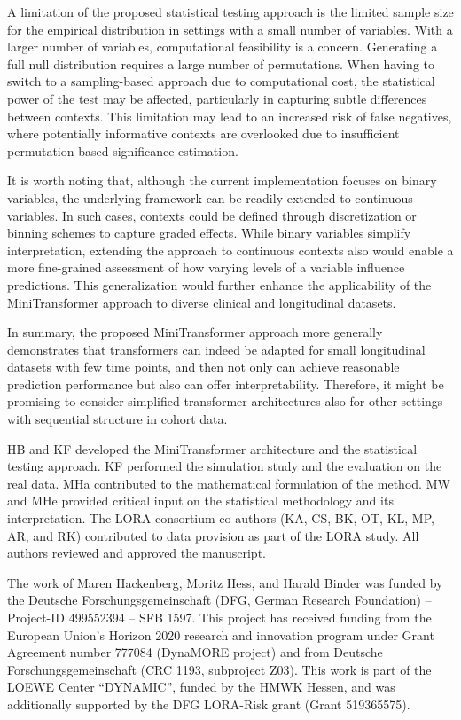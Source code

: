 \documentclass[AMA,Times1COL]{WileyNJDv5} %
\begin{document}
A limitation of the proposed statistical testing approach is the limited sample size for the empirical distribution in settings with a small number of variables. With a larger number of variables, computational feasibility is a concern. Generating a full null distribution requires a large number of permutations. When having to switch to a sampling-based approach due to computational cost,  the statistical power of the test may be affected, particularly in capturing subtle differences between contexts. This limitation may lead to an increased risk of false negatives, where potentially informative contexts are overlooked due to insufficient permutation-based significance estimation. 

It is worth noting that, although the current implementation focuses on binary variables, the underlying framework can be readily extended to continuous variables. In such cases, contexts could be defined through discretization or binning schemes to capture graded effects. While binary variables simplify interpretation, extending the approach to continuous contexts also would enable a more fine-grained assessment of how varying levels of a variable influence predictions. This generalization would further enhance the applicability of the MiniTransformer approach to diverse clinical and longitudinal datasets.

In summary, the proposed MiniTransformer approach more generally demonstrates that transformers can indeed be adapted for small longitudinal datasets with few time points, and then not only can achieve reasonable prediction performance but also can offer interpretability. Therefore, it might be promising to consider simplified transformer architectures also for other settings with sequential structure in cohort data.





{}

HB and KF developed the MiniTransformer architecture and the statistical testing approach. KF performed the simulation study and the evaluation on the real data. MHa contributed to the mathematical formulation of the method. MW and MHe provided critical input on the statistical methodology and its interpretation. The LORA consortium co-authors (KA, CS, BK, OT, KL, MP, AR, and RK) contributed to data provision as part of the LORA study. All authors reviewed and approved the manuscript.

The work of Maren Hackenberg, Moritz Hess, and Harald Binder was funded by the Deutsche Forschungsgemeinschaft (DFG, German Research Foundation) – Project-ID 499552394 – SFB 1597.
This project has received funding from the European Union’s Horizon 2020 research and innovation program under Grant Agreement number 777084 (DynaMORE project) and from Deutsche Forschungsgemeinschaft (CRC 1193, subproject Z03). This work is part of the LOEWE Center “DYNAMIC”, funded by the HMWK Hessen, and was additionally supported by the DFG LORA-Risk grant (Grant 519365575).
\end{document}

